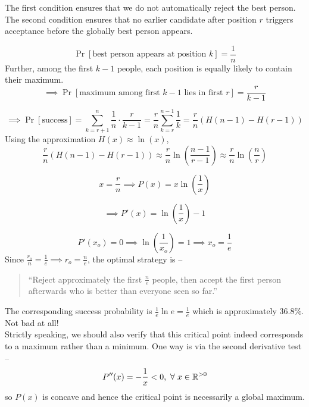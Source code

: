 \noindent The first condition ensures that we do not automatically reject the best person.
The second condition ensures that no earlier candidate after position \(r\) triggers acceptance before the globally best person appears.

\vspace{0.4em}
\[
\Pr[\text{best person appears at position }k] = \frac{1}{n}
\]
\vspace{0.2em}
Further, among the first \(k-1\) people, each position is equally likely to contain their maximum. 
\vspace{0.2em}
\[
\implies
\Pr[\text{maximum among first }k-1\text{ lies in first }r]
=
\frac{r}{k-1}
\]

\[
\implies
\Pr[\text{success}]
=
\sum_{k=r+1}^{n}
\frac{1}{n}\cdot\frac{r}{k-1}
=
\frac{r}{n}
\sum_{k=r}^{n-1}\frac{1}{k}
=
\frac{r}{n} \left(H(n-1)-H(r-1)\right)
\]
\vspace{0.2em}
\noindent Using the approximation $H(x) \approx \ln(x)$,
\[
\frac{r}{n} \left(H(n-1)-H(r-1)\right)
\approx
\frac{r}{n} \ln\left(\frac{n-1}{r-1}\right) 
\approx
\frac{r}{n} \ln\left(\frac{n}{r}\right)
\]

\[
x=\frac{r}{n} 
\implies
P(x)=x\ln\left(\frac{1}{x}\right)
\]

\[
\implies
P'(x)=\ln\left(\frac{1}{x}\right)-1
\]

\[
P'(x_o)=0
\implies
\ln\left(\frac{1}{x_o}\right)=1
\implies
x_o=\frac{1}{e}
\]
\vspace{0.4em}
\noindent Since $\frac{r_o}{n}=\frac{1}{e} \implies r_o=\frac{n}{e}$, the optimal strategy is --
\begin{quote}
``Reject approximately the first \(\frac{n}{e}\) people, then accept the first person 
afterwards who is better than everyone seen so far.''
\end{quote}

\noindent The corresponding success probability is $\frac{1}{e}\ln e = \frac{1}{e}$ which is 
approximately \(\mathbf{36.8\%}\). Not bad at all!\\


\noindent Strictly speaking, we should also verify that this critical point indeed corresponds to a 
maximum rather than a minimum. One way is via the second derivative test --
\[
P''(x)=-\frac{1}{x}<0\text{,} \hspace{0.5em} \forall \hspace{0.3em} x \in \mathbb R^{>0}
\]
so \(P(x)\) is concave and hence the critical point is necessarily a global maximum.\\


